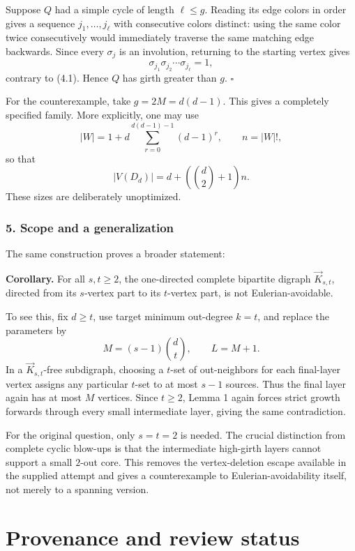 \documentclass[
  11pt,
  a4paper,
]{article}
\begin{document}
Suppose \(Q\) had a simple cycle of length \(\ell\le g\). Reading its
edge colors in order gives a sequence \(j_1,\ldots,j_\ell\) with
consecutive colors distinct: using the same color twice consecutively
would immediately traverse the same matching edge backwards. Since every
\(\sigma_j\) is an involution, returning to the starting vertex gives \[
\sigma_{j_1}\sigma_{j_2}\cdots\sigma_{j_\ell}=1,
\] contrary to (4.1). Hence \(Q\) has girth greater than \(g\).
\(\square\)

For the counterexample, take \(g=2M=d(d-1)\). This gives a completely
specified family. More explicitly, one may use \[
|W|=1+d\sum_{r=0}^{d(d-1)-1}(d-1)^r,
\qquad n=|W|!,
\] so that \[
|V(D_d)|=d+\left(\binom d2+1\right)n.
\] These sizes are deliberately unoptimized.

\subsubsection{5. Scope and a
generalization}\label{scope-and-a-generalization}

The same construction proves a broader statement:

\textbf{Corollary.} For all \(s,t\ge2\), the one-directed complete
bipartite digraph \(\vec K_{s,t}\), directed from its \(s\)-vertex part
to its \(t\)-vertex part, is not Eulerian-avoidable.

To see this, fix \(d\ge t\), use target minimum out-degree \(k=t\), and
replace the parameters by \[
M=(s-1)\binom dt,\qquad L=M+1.
\] In a \(\vec K_{s,t}\)-free subdigraph, choosing a \(t\)-set of
out-neighbors for each final-layer vertex assigns any particular
\(t\)-set to at most \(s-1\) sources. Thus the final layer again has at
most \(M\) vertices. Since \(t\ge2\), Lemma 1 again forces strict growth
forwards through every small intermediate layer, giving the same
contradiction.

For the original question, only \(s=t=2\) is needed. The crucial
distinction from complete cyclic blow-ups is that the intermediate
high-girth layers cannot support a small \(2\)-out core. This removes
the vertex-deletion escape available in the supplied attempt and gives a
counterexample to Eulerian-avoidability itself, not merely to a spanning
version.

\appendix

\section{Provenance and review
status}\label{provenance-and-review-status}
\end{document}
